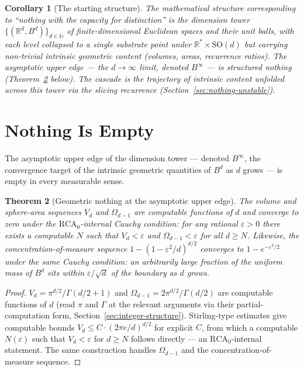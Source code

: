 \documentclass[11pt,a4paper]{article}
\newtheorem{theorem}{Theorem}[section]
\newtheorem{corollary}[theorem]{Corollary}
\begin{document}
\begin{corollary}[The starting structure]\label{cor:start}
The mathematical structure corresponding to ``nothing with the
capacity for distinction'' is the dimension tower
$\{(\mathbb{R}^d, B^d)\}_{d\in\mathbb{N}}$ of finite-dimensional
Euclidean spaces and their unit balls, with each level collapsed to
a single substrate point under
$\mathbb{R}^*\times\mathrm{SO}(d)$ but carrying non-trivial intrinsic
geometric content (volumes, areas, recurrence ratios). The asymptotic
upper edge --- the $d\to\infty$ limit, denoted $B^\infty$ --- is
structured nothing (Theorem~\ref{thm:nothing} below). The cascade is
the trajectory of intrinsic content unfolded across this tower via
the slicing recurrence (Section~\ref{sec:nothing-unstable}).
\end{corollary}

\section{Nothing Is Empty}\label{sec:nothing-is-empty}

The asymptotic upper edge of the dimension tower --- denoted
$B^\infty$, the convergence target of the intrinsic geometric
quantities of $B^d$ as $d$ grows --- is empty in every measurable
sense.

\begin{theorem}[Geometric nothing at the asymptotic upper edge]\label{thm:nothing}
The volume and sphere-area sequences $V_d$ and $\Omega_{d-1}$ are
computable functions of $d$ and converge to zero under the
$\mathrm{RCA}_0$-internal Cauchy condition: for any rational
$\varepsilon>0$ there exists a computable $N$ such that $V_d <
\varepsilon$ and $\Omega_{d-1} < \varepsilon$ for all $d\geq N$.
Likewise, the concentration-of-measure sequence
$1 - (1-\varepsilon^2/d)^{d/2}$ converges to $1 - e^{-\varepsilon^2/2}$
under the same Cauchy condition: an arbitrarily large fraction of
the uniform mass of $B^d$ sits within $\varepsilon/\sqrt{d}$ of the
boundary as $d$ grows.
\end{theorem}

\begin{proof}
$V_d = \pi^{d/2}/\Gamma(d/2+1)$ and $\Omega_{d-1} = 2\pi^{d/2}/\Gamma(d/2)$
are computable functions of $d$ (read $\pi$ and $\Gamma$ at the
relevant arguments via their partial-computation form,
Section~\ref{sec:integer-structure}). Stirling-type estimates give
computable bounds $V_d \leq C \cdot (2\pi e/d)^{d/2}$ for explicit
$C$, from which a computable $N(\varepsilon)$ such that
$V_d<\varepsilon$ for $d\geq N$ follows directly --- an
$\mathrm{RCA}_0$-internal statement. The same construction handles
$\Omega_{d-1}$ and the concentration-of-measure sequence.
\end{proof}
\end{document}
